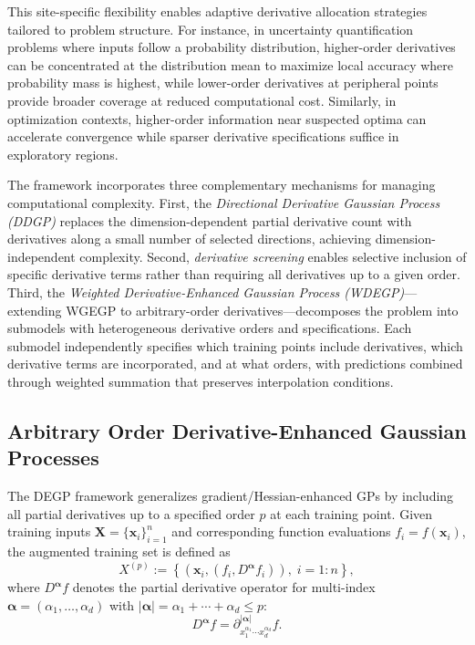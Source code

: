 \documentclass[12pt]{article}
\begin{document}
This site-specific flexibility enables adaptive derivative allocation strategies 
tailored to problem structure. For instance, in uncertainty quantification problems 
where inputs follow a probability distribution, higher-order derivatives can be 
concentrated at the distribution mean to maximize local accuracy where probability 
mass is highest, while lower-order derivatives at peripheral points provide broader 
coverage at reduced computational cost. Similarly, in optimization contexts, 
higher-order information near suspected optima can accelerate convergence while 
sparser derivative specifications suffice in exploratory regions.

The framework incorporates three complementary mechanisms for managing computational 
complexity. First, the \textit{Directional Derivative Gaussian Process (DDGP)} replaces the dimension-dependent partial derivative count with derivatives along a small number of selected directions, achieving dimension-independent complexity. Second, \textit{derivative screening} enables selective inclusion of 
specific derivative terms rather than requiring all derivatives up to a given order. 
Third, the \textit{Weighted Derivative-Enhanced Gaussian Process (WDEGP)}—extending WGEGP to arbitrary-order 
derivatives—decomposes the problem into submodels with heterogeneous derivative 
orders and specifications. Each submodel independently specifies which training 
points include derivatives, which derivative terms are incorporated, and at what 
orders, with predictions combined through weighted summation that preserves 
interpolation conditions.

\subsection{Arbitrary Order Derivative-Enhanced Gaussian Processes}
\label{subsec:degp}

The DEGP framework generalizes gradient/Hessian-enhanced GPs by including all partial derivatives up to a specified order $p$ at each training point. Given training inputs $\mathbf{X} = \{\mathbf{x}_i\}_{i=1}^{n}$ and corresponding function evaluations $f_i = f(\mathbf{x}_i)$, the augmented training set is defined as
\begin{equation}
	X^{(p)} := \left\{ \left( \mathbf{x}_i, \left( f_i, D^{\boldsymbol{\alpha}} f_i \right) \right), \; i = 1{:}n \right\},
\end{equation}
where $D^{\boldsymbol{\alpha}} f$ denotes the partial derivative operator for multi-index $\boldsymbol{\alpha} = (\alpha_1, \dots, \alpha_d)$ with $|\boldsymbol{\alpha}| = \alpha_1 + \cdots + \alpha_d \le p$:
\begin{equation}
	D^{\boldsymbol{\alpha}} f = \partial^{|\boldsymbol{\alpha}|}_{x_1^{\alpha_1} \cdots x_d^{\alpha_d}} f.
\end{equation}
\end{document}
